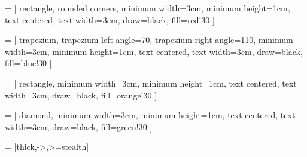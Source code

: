 \usepackage{tikz}

\usetikzlibrary{arrows, automata, shapes.geometric, positioning, arrows.meta}

 = [
  rectangle, rounded corners,
  minimum width=3cm, minimum height=1cm,
  text centered, text width=3cm,
  draw=black, fill=red!30
]

 = [
  trapezium, trapezium left angle=70, trapezium right angle=110,
  minimum width=3cm, minimum height=1cm,
  text centered, text width=3cm,
  draw=black, fill=blue!30
]

 = [
  rectangle,
  minimum width=3cm, minimum height=1cm,
  text centered, text width=3cm,
  draw=black, fill=orange!30
]

 = [
  diamond,
  minimum width=3cm, minimum height=1cm,
  text centered, text width=3cm,
  draw=black, fill=green!30
]

 = [thick,->,>=stealth]
